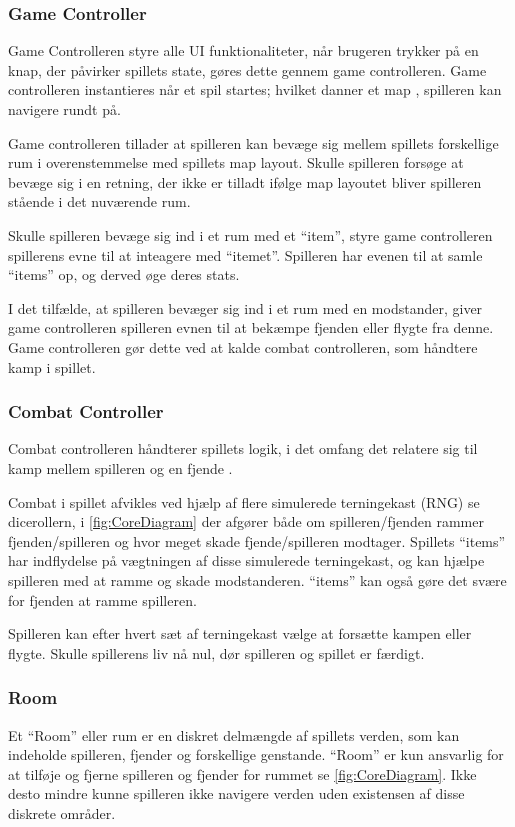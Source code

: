 \subsubsection{Game Controller}
Game Controlleren styre alle UI funktionaliteter, når brugeren
trykker på en knap, der påvirker spillets state, gøres dette
gennem game controlleren. Game controlleren instantieres når
et spil startes; hvilket danner et map \parencite[Section 10.3.1][]
{TekniskBilag}, spilleren kan navigere rundt på. 

Game controlleren tillader at spilleren kan bevæge sig mellem
spillets forskellige rum \parencite[Section 9.3.1][]{TekniskBilag} 
i overenstemmelse med spillets map layout. Skulle spilleren forsøge at
bevæge sig i en retning, der ikke er tilladt ifølge map layoutet bliver 
spilleren stående i det nuværende rum.

Skulle spilleren bevæge sig ind i et rum med et ``item'', styre 
game controlleren spillerens evne til at inteagere med ``itemet''.
Spilleren har evenen til at samle ``items'' op, og derved øge deres
stats.

I det tilfælde, at spilleren bevæger sig ind i et rum med en modstander,
giver game controlleren spilleren evnen til at bekæmpe fjenden eller
flygte fra denne. Game controlleren gør dette ved at kalde combat controlleren,
som håndtere kamp i spillet.

\subsubsection{Combat Controller}
Combat controlleren håndterer spillets logik, i det omfang det relatere sig til
kamp mellem spilleren og en fjende \parencite[Section 9.3.3][Figur 17]{TekniskBilag}.

\noindent Combat i spillet afvikles ved hjælp af flere simulerede terningekast (RNG) se dicerollern,
i \autoref{fig:CoreDiagram} der afgører både om spilleren/fjenden rammer fjenden/spilleren 
og hvor meget skade fjende/spilleren modtager. Spillets ``items'' har indflydelse
på vægtningen af disse simulerede terningekast, og kan hjælpe spilleren med at ramme og skade 
modstanderen. ``items'' kan også gøre det svære for fjenden at ramme spilleren.

Spilleren kan efter hvert sæt af terningekast vælge at forsætte kampen eller
flygte. Skulle spillerens liv nå nul, dør spilleren og spillet er færdigt.

\subsubsection{Room}
Et ``Room'' eller rum er en diskret delmængde af spillets verden, som kan indeholde
spilleren, fjender og forskellige genstande. ``Room'' er kun ansvarlig for at tilføje
og fjerne spilleren og fjender for rummet se \autoref{fig:CoreDiagram}. Ikke desto mindre
kunne spilleren ikke navigere verden uden existensen af disse diskrete områder.

